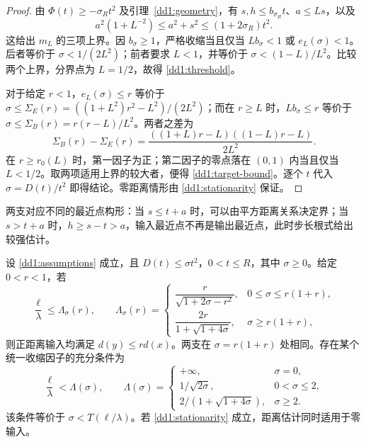 \begin{proof}
由 $\Phi(t)\ge-\sigma_Rt^2$ 及引理~\ref{dd1:geometry}，有
$s,h\le b_{\sigma_R}t$、$a\le Ls$，以及
\[
 a^2(1+L^{-2})\le a^2+s^2\le(1+2\sigma_R)t^2.
\]
这给出 $m_L$ 的三项上界。因 $b_\sigma\ge1$，严格收缩当且仅当
$Lb_\sigma<1$ 或 $e_L(\sigma)<1$。后者等价于 $\sigma<1/(2L^2)$；前者要求 $L<1$，并等价于 $\sigma<(1-L)/L^2$。比较两个上界，分界点为 $L=1/2$，故得 \eqref{dd1:threshold}。

对于给定 $r<1$，$e_L(\sigma)\le r$ 等价于
$\sigma\le\Sigma_E(r)=((1+L^2)r^2-L^2)/(2L^2)$；而在 $r\ge L$ 时，$Lb_\sigma\le r$ 等价于 $\sigma\le\Sigma_B(r)=r(r-L)/L^2$。两者之差为
\begin{equation}\label{dd1:branch-difference}
 \Sigma_B(r)-\Sigma_E(r)
 =\frac{((1+L)r-L)((1-L)r-L)}{2L^2}.
\end{equation}
在 $r\ge r_0(L)$ 时，第一因子为正；第二因子的零点落在 $(0,1)$ 内当且仅当 $L<1/2$。取两项适用上界的较大者，便得 \eqref{dd1:target-bound}。逐个 $t$ 代入 $\sigma=D(t)/t^2$ 即得结论。零距离情形由 \eqref{dd1:stationarity} 保证。
\end{proof}

两支对应不同的最近点构形：当 $s\le t+a$ 时，可以由平方距离关系决定界；当 $s>t+a$ 时，$h\ge s-t>a$，输入最近点不再是输出最近点，此时步长根式给出较强估计。

\begin{theorem}[DD12：由允许缺陷确定正则性]\label{thm:dd12}
设 \eqref{dd1:assumptions} 成立，且 $D(t)\le\sigma t^2$，$0<t\le R$，其中 $\sigma\ge0$。给定 $0<r<1$，若
\begin{equation}\label{dd1:inverse-target}
 \frac\ell\lambda\le\Lambda_\sigma(r),\qquad
 \Lambda_\sigma(r)=\begin{cases}
 \dfrac r{\sqrt{1+2\sigma-r^2}},&0\le\sigma\le r(1+r),\\[6pt]
 \dfrac{2r}{1+\sqrt{1+4\sigma}},&\sigma\ge r(1+r),
 \end{cases}
\end{equation}
则正距离输入均满足 $d(y)\le r d(x)$。两支在 $\sigma=r(1+r)$ 处相同。存在某个统一收缩因子的充分条件为
\begin{equation}\label{dd1:inverse-threshold}
 \frac\ell\lambda<\Lambda(\sigma),\qquad
 \Lambda(\sigma)=\begin{cases}
 +\infty,&\sigma=0,\\[2pt]
 1/\sqrt{2\sigma},&0<\sigma\le2,\\[2pt]
 2/(1+\sqrt{1+4\sigma}),&\sigma\ge2.
 \end{cases}
\end{equation}
该条件等价于 $\sigma<T(\ell/\lambda)$。若 \eqref{dd1:stationarity} 成立，距离估计同时适用于零输入。
\end{theorem}

